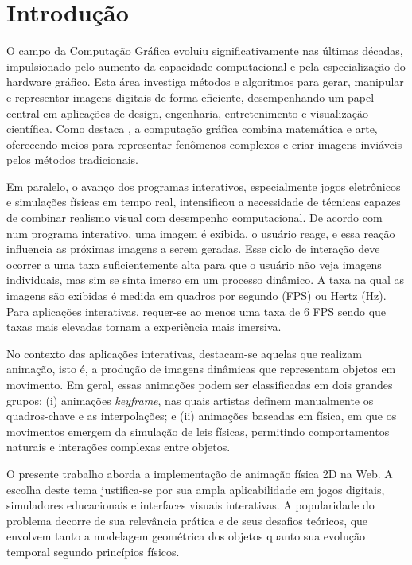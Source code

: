 \chapter{Introdução}

O campo da Computação Gráfica evoluiu significativamente nas últimas décadas, impulsionado pelo aumento da capacidade computacional e pela especialização do hardware gráfico. Esta área investiga métodos e algoritmos para gerar, manipular e representar imagens digitais de forma eficiente, desempenhando um papel central em aplicações de design, engenharia, entretenimento e visualização científica. Como destaca , a computação gráfica combina matemática e arte, oferecendo meios para representar fenômenos complexos e criar imagens inviáveis pelos métodos tradicionais.

Em paralelo, o avanço dos programas interativos, especialmente jogos eletrônicos e simulações físicas em tempo real, intensificou a necessidade de técnicas capazes de combinar realismo visual com desempenho computacional. De acordo com  num programa interativo, uma imagem é exibida, o usuário reage, e essa reação influencia as próximas imagens a serem geradas.
Esse ciclo de interação deve ocorrer a uma taxa suficientemente alta para que o usuário não veja imagens individuais, mas sim se sinta imerso em um processo dinâmico. A taxa na qual as imagens são exibidas é medida em quadros por segundo (FPS) ou Hertz (Hz). Para aplicações interativas, requer-se ao menos uma taxa de 6 FPS sendo que taxas mais elevadas tornam a experiência mais imersiva.

No contexto das aplicações interativas, destacam-se aquelas que realizam animação, isto é, a produção de imagens dinâmicas que representam objetos em movimento. Em geral, essas animações podem ser classificadas em dois grandes grupos: (i) animações \textit{keyframe}, nas quais artistas definem manualmente os quadros-chave e as interpolações; e (ii) animações baseadas em física, em que os movimentos emergem da simulação de leis físicas, permitindo comportamentos naturais e interações complexas entre objetos.

O presente trabalho aborda a implementação de animação física 2D na Web. A escolha deste tema justifica-se por sua ampla aplicabilidade em jogos digitais, simuladores educacionais e interfaces visuais interativas. A popularidade do problema decorre de sua relevância prática e de seus desafios teóricos, que envolvem tanto a modelagem geométrica dos objetos quanto sua evolução temporal segundo princípios físicos.

